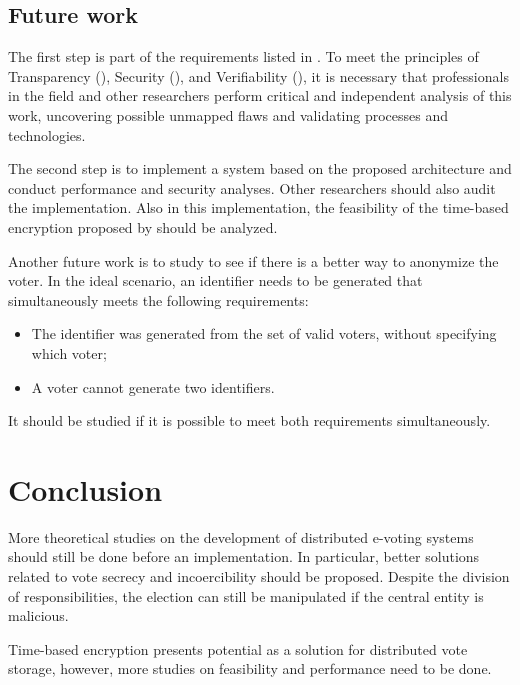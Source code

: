 \documentclass[english]{textolivre}
\begin{document}
\subsection{Future work \label{sec-future}}

The first step is part of the requirements listed in . To meet the principles of Transparency (), Security (), and Verifiability (), it is necessary that professionals in the field and other researchers perform critical and independent analysis of this work, uncovering possible unmapped flaws and validating processes and technologies.

The second step is to implement a system based on the proposed architecture and conduct performance and security analyses. Other researchers should also audit the implementation. Also in this implementation, the feasibility of the time-based encryption proposed by \textcite{Liu} should be analyzed.

Another future work is to study to see if there is a better way to anonymize the voter. In the ideal scenario, an identifier needs to be generated that simultaneously meets the following requirements:

\begin{itemize}
    \item The identifier was generated from the set of valid voters, without specifying which voter;
    
    \item A voter cannot generate two identifiers.
\end{itemize}

It should be studied if it is possible to meet both requirements simultaneously.

\section{Conclusion \label{sec-conclusion}}

More theoretical studies on the development of distributed e-voting systems should still be done before an implementation. In particular, better solutions related to vote secrecy and incoercibility should be proposed. Despite the division of responsibilities, the election can still be manipulated if the central entity is malicious.

Time-based encryption presents potential as a solution for distributed vote storage, however, more studies on feasibility and performance need to be done.
\end{document}
